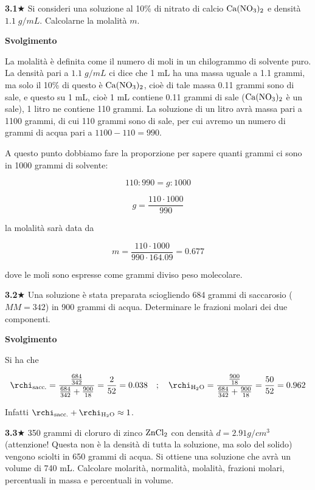 \textbf{3.1}$\bigstar$ Si consideri una soluzione al 10\% di nitrato di calcio $\rm Ca(NO_3)_2$ e densità $1.1\;g/mL$. Calcolarne la molalità $m$.

\vspace{0.2cm}\large\textbf{Svolgimento}\normalsize

\vspace{0.2cm}La molalità è definita come il numero di moli in un chilogrammo di solvente puro. La densità pari a $1.1\;g/mL$ ci dice che 1 mL ha una massa uguale a 1.1 grammi, ma solo il 10\% di questo è $\rm Ca(NO_3)_2$, cioè di tale massa 0.11 grammi sono di sale, e questo su 1 mL, cioè 1 mL contiene 0.11 grammi di sale ($\rm Ca(NO_3)_2$ è un sale), 1 litro ne contiene 110 grammi. La soluzione di un litro avrà massa pari a 1100 grammi, di cui 110 grammi sono di sale, per cui avremo un numero di grammi di acqua pari a $1100-110=990$.

A questo punto dobbiamo fare la proporzione per sapere quanti grammi ci sono in 1000 grammi di solvente:

$$110:990=g:1000$$

$$g=\frac{110 \cdot 1000}{990}$$

la molalità sarà data da

$$m=\frac{110 \cdot 1000}{990 \cdot 164.09}=0.677$$

dove le moli sono espresse come grammi diviso peso molecolare.

\vspace{0.2cm}\textbf{3.2}$\bigstar$ Una soluzione è stata preparata sciogliendo 684 grammi di saccarosio ($MM=342$) in 900 grammi di acqua. Determinare le frazioni molari dei due componenti.

\vspace{0.2cm}\large\textbf{Svolgimento}\normalsize

\vspace{0.2cm}Si ha che

$$\rchi_{\text{sacc.}}=\frac{\frac{684}{342}}{\frac{684}{342} + \frac{900}{18}}=\frac{2}{52}=0.038
\quad;\quad
\rchi_{\text{H}_2\text{O}}=\frac{\frac{900}{18}}{\frac{684}{342} + \frac{900}{18}}=\frac{50}{52}=0.962$$

\vspace{0.2cm}Infatti $\rchi_{\text{sacc.}} + \rchi_{\text{H}_2\text{O}}\approx 1$.

\vspace{0.2cm}\textbf{3.3}$\bigstar$ 350 grammi di cloruro di zinco $\rm ZnCl_2$ con densità $d=2.91 g/cm^3$ (attenzione! Questa non è la densità di tutta la soluzione, ma solo del solido) vengono sciolti in 650 grammi di acqua. Si ottiene una soluzione che avrà un volume di 740 mL. Calcolare molarità, normalità, molalità, frazioni molari, percentuali in massa e percentuali in volume.

